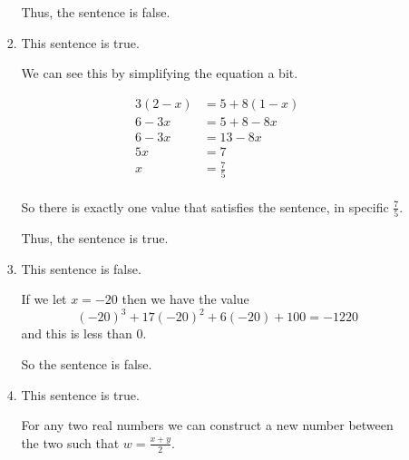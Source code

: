 \documentclass[12pt,letterpaper]{article}
\begin{document}
\begin{enumerate}
\begin{enumerate}
\begin{enumerate}
              Thus, the sentence is false.
            \item
              This sentence is true.

              We can see this by simplifying the equation a bit.

              \begin{align*}
                3(2 - x) &= 5 + 8(1 - x) \\
                6 - 3x &= 5 + 8 - 8x \\
                6 - 3x &= 13 - 8x \\
                5x &= 7 \\
                x &= \frac{7}{5} \\
              \end{align*}

              So there is exactly one value that satisfies the sentence, in specific $\frac{7}{5}$.

              Thus, the sentence is true.
            \setcounter{enumiii}{10}
            \item
              This sentence is false.

              If we let $x = -20$ then we have the value
              \[
                (-20)^3 + 17(-20)^2 + 6(-20) + 100 = -1220
              \]
              and this is less than 0.

              So the sentence is false.
            \item
              This sentence is true.

              For any two real numbers we can construct a new number between the two such that $w = \frac{x + y}{2}$.
          \end{enumerate}


\end{enumerate}
\end{enumerate}
\end{document}
